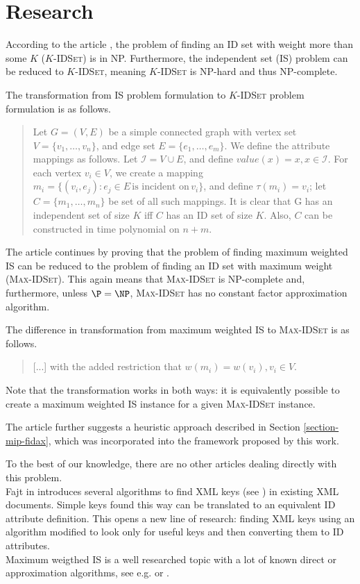\chapter{Research}

According to the article \cite[Chapter~4]{fidax}, the problem of finding an ID set with weight more than some $K$ ($K$-\textsc{IDSet}) is in NP. Furthermore, the independent set (IS) problem can be reduced to $K$-\textsc{IDSet}, meaning $K$-\textsc{IDSet} is NP-hard and thus NP-complete.

The transformation from IS problem formulation to $K$-\textsc{IDSet} problem formulation is as follows.

\begin{quote}
Let $G = (V, E)$ be a simple connected graph with vertex set $V = \{v_1, \ldots, v_n\}$, and edge set $E = \{e_1, \ldots, e_m\}$. We define the attribute mappings as follows. Let $ \mathcal{I} = V \cup E$, and define $value(x) = x, x \in \mathcal{I}$. For each vertex $v_i \in V$, we create a mapping $m_i = \{(v_i, e_j): e_j \in E \,\text{is incident on}\, v_i \}$, and define $\tau(m_i) = v_i$; let $C = \{m_1, \ldots, m_n\}$ be set of all such mappings. It is clear that G has an independent set of size $K$ iff $C$ has an ID set of size $K$. Also, $C$ can be constructed in time polynomial on $n+m$.
\end{quote}

The article continues by proving that the problem of finding maximum weighted IS can be reduced to the problem of finding an ID set with maximum weight (\textsc{Max-IDSet}). This again means that \textsc{Max-IDSet} is NP-complete and, furthermore, unless $\P = \NP$, \textsc{Max-IDSet} has no constant factor approximation algorithm.

The difference in transformation from maximum weighted IS to \textsc{Max-IDSet} is as follows.

\begin{quote}
[...] with the added restriction that $w(m_i) = w(v_i), v_i \in V$.
\end{quote}

Note that the transformation works in both ways: it is equivalently possible to create a maximum weighted IS instance for a given \textsc{Max-IDSet} instance.

The article further suggests a heuristic approach described in Section \ref{section-mip-fidax}, which was incorporated into the framework proposed by this work.

To the best of our knowledge, there are no other articles dealing directly with this problem.\\

Fajt in \cite{fajt} introduces several algorithms to find XML keys (see \cite{keX}) in existing XML documents. Simple keys found this way can be translated to an equivalent ID attribute definition. This opens a new line of research: finding XML keys using an algorithm modified to look only for useful keys and then converting them to ID attributes.\\

Maximum weigthed IS is a well researched topic with a lot of known direct or approximation algorithms, see e.g. \cite{JM1986425} or \cite{Fomin:2009:MCA:1552285.1552286}.\\